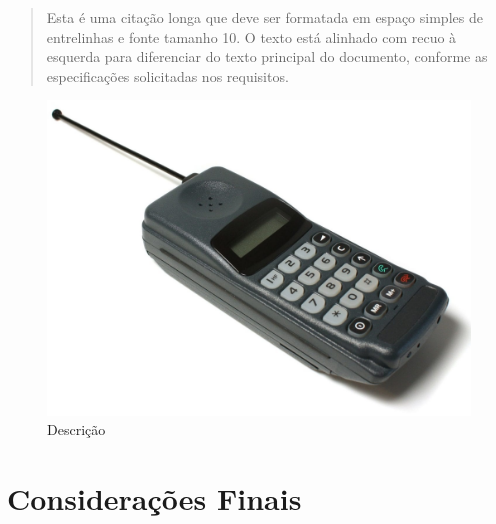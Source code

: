 \documentclass{wticifes2025}
\begin{document}
\begin{quote}
Esta é uma citação longa que deve ser formatada em espaço simples de entrelinhas e fonte tamanho 10. O texto está alinhado com recuo à esquerda para diferenciar do texto principal do documento, conforme as especificações solicitadas nos requisitos.
\end{quote}

\lipsum[3]

\begin{figure}
    \centering
    \includegraphics[width=0.5\linewidth]{img/img.jpg}
    \caption{Descrição}
    \label{fig:enter-label}
\end{figure}

\section{Considerações Finais}
\lipsum[2]

\end{document}
